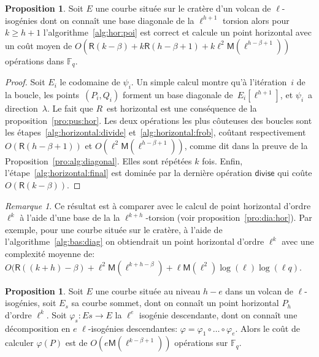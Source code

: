 \documentclass[10pt,a4paper]{book}
\theoremstyle{plain}
\theoremstyle{definition}
\theoremstyle{definition}
\theoremstyle{definition}
\theoremstyle{definition}
\newtheorem{prop}[thm]{Proposition}
\theoremstyle{definition}
\theoremstyle{remark}
\newtheorem{rem}[thm]{Remarque}
\theoremstyle{remark}
\theoremstyle{definition}
\begin{document}
\begin{prop}\label{pro:alg:hor}
Soit $E$ une courbe située sur le cratère d'un volcan de $\ell$-isogénies dont 
on connaît une base diagonale de la $\ell^{h+1}$ torsion alors pour 
$k \geqslant h+1$ l'algorithme~\ref{alg:hor:poi} est correct et calcule un 
point horizontal avec un coût moyen de $O(\mathsf{R}(k-\beta) + k\mathsf{R}(h-\beta+1) + k\ell^2\mathsf{M}(\ell^{h-\beta+1}))$
  opérations dans $\mathbb{F}_q$.
\end{prop}
\begin{proof}
Soit $E_i$ le codomaine de $\psi_i$.
Un simple calcul montre qu'à  l'itération~$i$ de la boucle,
les points~$(P_i, Q_i)$ forment un base diagonale de~$E_i[\ell^{h+1}]$,
et $\psi_i$~a direction~$\lambda$.
Le fait que $R$~est horizontal est une conséquence
de la proposition~\ref{pro:pus:hor}.
Les deux opérations les plus côuteuses des boucles sont les
étapes~\ref{alg:horizontal:divide} et~\ref{alg:horizontal:frob},
coûtant respectivement $O(\mathsf{R}(h-\beta+1))$ et 
$O(\ell^2\mathsf{M}(\ell^{h-\beta+1}))$, comme
dit dans la preuve de la Proposition~\ref{pro:alg:diagonal}. Elles sont 
répétées $k$ fois. Enfin, l'étape~\ref{alg:horizontal:final} est
dominée par la dernière opération $\mathsf{divise}$ qui coûte $O(\mathsf{R}(k-\beta))$.
\end{proof}

\begin{rem}
Ce résultat est à comparer avec le calcul de point horizontal d'ordre $\ell^k$ 
à l'aide d'une base de la la $\ell^{k+h}$-torsion (voir 
proposition~\ref{pro:dia:hor}). Par exemple, pour une 
courbe située sur le cratère, à l'aide de l'algorithme~\ref{alg:bas:diag} on 
obtiendrait un point horizontal d'ordre $\ell^k$ avec une complexité moyenne 
de: $O(\mathsf{R}((k+h)-\beta)+\ell^{2}
\mathsf{M}(\ell^{k+h-\beta})+\ell\mathsf{M}(\ell^2)\log(\ell)\log(\ell q)$.
\end{rem}

\begin{prop}
\label{pro:par:hor}
Soit $E$ une courbe située au niveau $h-e$ dans un volcan de $\ell$-isogénies, 
soit $E_s$ sa courbe sommet, dont on connaît un point horizontal $P_h$ d'ordre 
$\ell^k$. Soit $\varphi_s:Es \rightarrow E $ la $\ell^{e}$ isogénie descendante,
dont on connaît une décomposition en $e$ $\ell$-isogénies descendantes: 
$\varphi=\varphi_1 \circ \dots \circ \varphi_{e}$. Alors le coût de calculer $\varphi(P)$ 
est de $O(e\mathsf{M}(\ell^{k-\beta+1}))$ opérations sur $\mathbb{F}_q$.
\end{prop}
\end{document}
